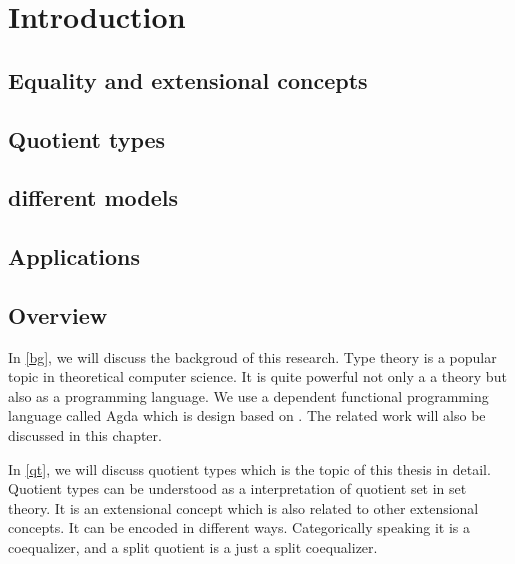 \chapter{Introduction}



\section{Equality and extensional concepts}

\section{Quotient types}

\section{different models}

\section{Applications}










\section{Overview}





In \autoref{bg}, we will discuss the backgroud of this research. Type theory is a popular topic in
theoretical computer science. It is quite powerful not only a a theory
but also as a programming language. We use a dependent functional
programming language called Agda which is design based on \mltt. The
 related work will also be discussed in this chapter.


In \autoref{qt}, we will discuss quotient types which is the topic of
this thesis in detail. Quotient types
can be understood as a interpretation of quotient set in set
theory. It is an extensional concept which is also related to other extensional concepts. It can be encoded in different ways. Categorically speaking it
is a coequalizer, and a split quotient is a just a split coequalizer.


